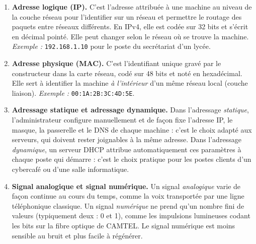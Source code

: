 \documentclass[11pt]{article}
\newcommand{\cle}[1]{{\popxbold\color{popdark}#1}}
\begin{document}
\begin{corrige}
\begin{enumerate}
\item \textbf{\cle{Adresse logique (IP)}.} C'est l'adresse attribuée à une machine au niveau de la couche réseau pour l'identifier sur un réseau et permettre le routage des paquets entre réseaux différents. En \cle{IPv4}, elle est codée sur 32 bits et s'écrit en décimal pointé. Elle peut changer selon le réseau où se trouve la machine. \emph{Exemple :} \texttt{192.168.1.10} pour le poste du secrétariat d'un lycée.
\item \textbf{\cle{Adresse physique (MAC)}.} C'est l'identifiant unique gravé par le constructeur dans la carte réseau, codé sur 48 bits et noté en hexadécimal. Elle sert à identifier la machine \emph{à l'intérieur} d'un même réseau local (couche liaison). \emph{Exemple :} \texttt{00:1A:2B:3C:4D:5E}.
\item \textbf{\cle{Adressage statique} et \cle{adressage dynamique}.} Dans l'adressage \emph{statique}, l'administrateur configure manuellement et de façon fixe l'adresse IP, le masque, la passerelle et le DNS de chaque machine : c'est le choix adapté aux serveurs, qui doivent rester joignables à la même adresse. Dans l'adressage \emph{dynamique}, un serveur \cle{DHCP} attribue automatiquement ces paramètres à chaque poste qui démarre : c'est le choix pratique pour les postes clients d'un cybercafé ou d'une salle informatique.
\item \textbf{\cle{Signal analogique} et \cle{signal numérique}.} Un signal \emph{analogique} varie de façon continue au cours du temps, comme la voix transportée par une ligne téléphonique classique. Un signal \emph{numérique} ne prend qu'un nombre fini de valeurs (typiquement deux : 0 et 1), comme les impulsions lumineuses codant les bits sur la fibre optique de \cle{CAMTEL}. Le signal numérique est moins sensible au bruit et plus facile à régénérer.
\end{enumerate}
\end{corrige}
\end{document}
